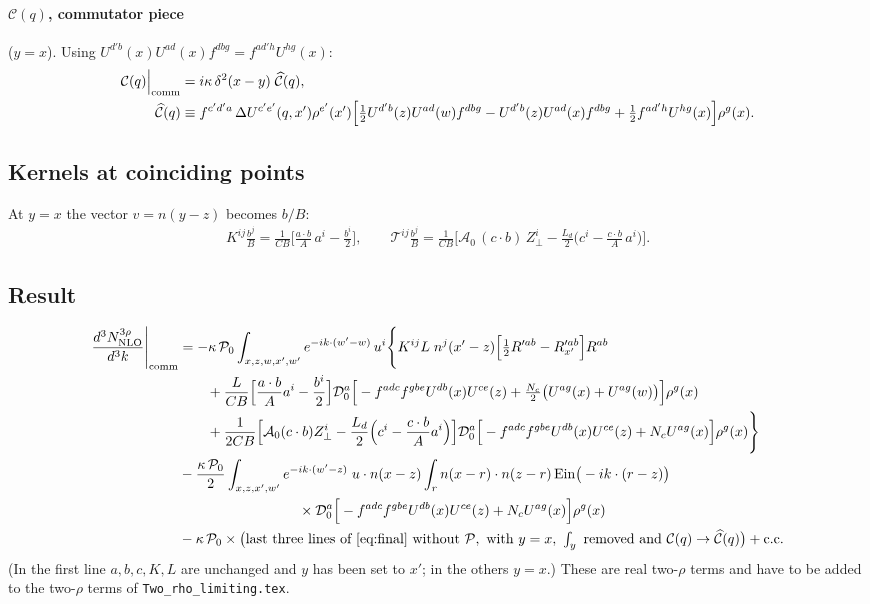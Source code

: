 \documentclass[10pt]{article}
\numberwithin{equation}{section}
\begin{document}
\paragraph{$\mathcal{C}(q)$, commutator piece} ($y=x$). Using $U^{d'b}(x)U^{ad}(x)f^{dbg}=f^{ad'h}U^{hg}(x)$:
\begin{align}
\mathcal{C}(q)\Big|_{\rm comm}&=i\kappa\,\delta^{2}(x-y)\;\widehat{\mathcal{C}}(q),\notag\\
\widehat{\mathcal{C}}(q)&\equiv f^{c'd'a}\,\Delta U^{c'e'}(q,x')\rho^{e'}(x')\Big[\tfrac12U^{d'b}(z)U^{ad}(w)f^{dbg}-U^{d'b}(z)U^{ad}(x)f^{dbg}+\tfrac12f^{ad'h}U^{hg}(x)\Big]\rho^{g}(x).
\end{align}

\subsection{Kernels at coinciding points}
At $y=x$ the vector $v=n(y-z)$ becomes $b/B$:
\begin{align}
K^{ij}\frac{b^{j}}{B}=\frac{1}{CB}\Big[\frac{a\cdot b}{A}\,a^{i}-\frac{b^{i}}{2}\Big],\qquad
\mathcal{T}^{ij}\frac{b^{j}}{B}=\frac{1}{CB}\Big[\mathcal{A}_{0}\,(c\cdot b)\,Z_{\perp}^{i}-\frac{L_{d}}{2}\Big(c^{i}-\frac{c\cdot b}{A}\,a^{i}\Big)\Big].
\end{align}

\subsection{Result}
\begin{align}
\frac{d^{3}N^{3\rho}_{\rm NLO}}{d^{3}k}\Bigg|_{\rm comm}&=-\kappa\,\mathcal{P}_{0}\int_{x,z,w,x',w'}e^{-ik\cdot(w'-w)}\,u^{i}\Bigg\{K^{ij}L\;n^{j}(x'-z)\Big[\tfrac12R'^{ab}-R'^{ab}_{x'}\Big]R^{ab}\notag\\
&\qquad+\frac{L}{CB}\Big[\frac{a\cdot b}{A}a^{i}-\frac{b^{i}}{2}\Big]\mathcal{D}_{0}^{a}\Big[-f^{adc}f^{gbe}U^{db}(x)U^{ce}(z)+\tfrac{N_{c}}{2}\big(U^{ag}(x)+U^{ag}(w)\big)\Big]\rho^{g}(x)\notag\\
&\qquad+\frac{1}{2CB}\Big[\mathcal{A}_{0}(c\cdot b)Z_{\perp}^{i}-\frac{L_{d}}{2}\Big(c^{i}-\frac{c\cdot b}{A}a^{i}\Big)\Big]\mathcal{D}_{0}^{a}\Big[-f^{adc}f^{gbe}U^{db}(x)U^{ce}(z)+N_{c}U^{ag}(x)\Big]\rho^{g}(x)\Bigg\}\notag\\
&-\frac{\kappa\,\mathcal{P}_{0}}{2}\int_{x,z,x',w'}e^{-ik\cdot(w'-z)}\;u\cdot n(x-z)\int_{r}n(x-r)\cdot n(z-r)\,{\rm Ein}\big(-ik\cdot(r-z)\big)\notag\\
&\hspace{3cm}\times\mathcal{D}_{0}^{a}\Big[-f^{adc}f^{gbe}U^{db}(x)U^{ce}(z)+N_{c}U^{ag}(x)\Big]\rho^{g}(x)\notag\\
&-\kappa\,\mathcal{P}_{0}\times\big(\text{last three lines of \eqref{eq:final} without }\mathcal{P},\text{ with }y=x,\ \textstyle\int_{y}\text{ removed and }\mathcal{C}(q)\to\widehat{\mathcal{C}}(q)\big)+{\rm c.c.} \label{eq:two}
\end{align}
(In the first line $a,b,c,K,L$ are unchanged and $y$ has been set to $x'$; in the others $y=x$.) These are real two-$\rho$ terms and have to be added to the two-$\rho$ terms of \texttt{Two\_rho\_limiting.tex}.
\end{document}

